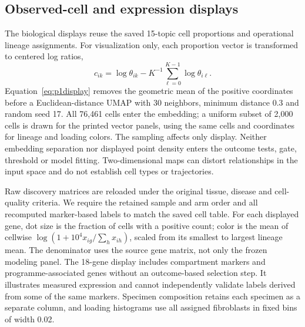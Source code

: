 \documentclass[10pt,a4paper]{article}
\begin{document}
\subsection{Observed-cell and expression displays}
The biological displays reuse the saved 15-topic cell proportions and operational lineage assignments. For visualization only, each proportion vector is transformed to centered log ratios,
\begin{equation}
c_{ik}=\log\theta_{ik}-K^{-1}\sum_{\ell=0}^{K-1}\log\theta_{i\ell}.\label{eq:p1display}
\end{equation}
Equation~\eqref{eq:p1display} removes the geometric mean of the positive coordinates before a Euclidean-distance UMAP with 30 neighbors, minimum distance 0.3 and random seed 17. All 76,461 cells enter the embedding; a uniform subset of 2,000 cells is drawn for the printed vector panels, using the same cells and coordinates for lineage and loading colors. The sampling affects only display. Neither embedding separation nor displayed point density enters the outcome tests, gate, threshold or model fitting. Two-dimensional maps can distort relationships in the input space and do not establish cell types or trajectories.

Raw discovery matrices are reloaded under the original tissue, disease and cell-quality criteria. We require the retained sample and arm order and all recomputed marker-based labels to match the saved cell table. For each displayed gene, dot size is the fraction of cells with a positive count; color is the mean of cellwise $\log(1+10^4 x_{ig}/\sum_h x_{ih})$, scaled from its smallest to largest lineage mean. The denominator uses the source gene matrix, not only the frozen modeling panel. The 18-gene display includes compartment markers and programme-associated genes without an outcome-based selection step. It illustrates measured expression and cannot independently validate labels derived from some of the same markers. Specimen composition retains each specimen as a separate column, and loading histograms use all assigned fibroblasts in fixed bins of width 0.02.
\end{document}
